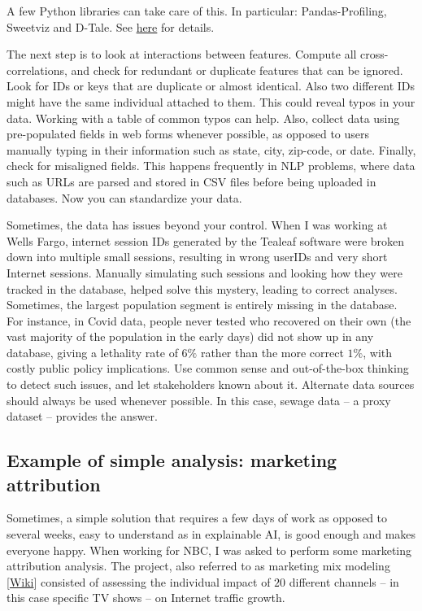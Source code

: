 \documentclass[oneside,10pt]{book}
\begin{document}
A few Python libraries can take care of this. In particular: Pandas-Profiling, Sweetviz and D-Tale. See \href{https://medium.com/@karteekmenda93/exploratory-data-analysis-tools-83ef538c879f}{here} for details.

The next step is to look at interactions between features. Compute all cross-correlations, and check for redundant or duplicate features that can be ignored. Look for IDs or keys that are duplicate or almost identical. Also two different IDs might have the same individual attached to them. This could reveal typos in your data. Working with a table of common typos can help. Also, collect data using
pre-populated fields in web forms whenever possible, as opposed to users manually typing in their information such as state, city, zip-code, or date. Finally, check for misaligned fields. This happens frequently in NLP problems, where data such as URLs are parsed and stored in CSV files before being uploaded in databases. Now you can standardize your data.

Sometimes, the data has issues beyond your control. When I was working at Wells Fargo, internet session IDs generated by the Tealeaf software were broken down into multiple small sessions, resulting in
 wrong userIDs and very short Internet sessions. Manually simulating such sessions and looking how they were tracked in the database, helped solve this mystery, leading to correct analyses. Sometimes, the largest population segment is entirely missing in the database. For instance, in Covid data, people never tested who recovered on their own (the vast majority of the population in the early days) did not show up in any database, giving a lethality rate of $6\%$ rather than the more correct $1\%$, with costly public policy implications. Use common sense and out-of-the-box thinking to detect such issues, and let stakeholders known about it. Alternate data sources should always be used whenever possible. In this case, sewage data -- a proxy dataset -- provides the answer.


\subsection{Example of simple analysis: marketing attribution}

Sometimes, a simple solution that requires a few days of work as opposed to several weeks, easy to understand as in explainable AI, is good enough and makes everyone happy. When working for NBC, I was asked to perform some \textcolor{index}{marketing attribution} analysis. The project, also referred to as marketing mix modeling [\href{https://en.wikipedia.org/wiki/Marketing_mix_modeling}{Wiki}] consisted of assessing the individual impact of $20$ different channels -- in this case specific TV shows -- on Internet traffic growth.
\end{document}
